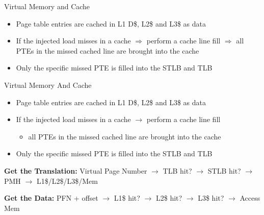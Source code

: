 \documentclass[aspectratio=169,12pt]{beamer}
\begin{document}
\begin{frame}{Virtual Memory and Cache}
\begin{tikzpicture}
\end{tikzpicture}

\footnotesize
\begin{itemize}
\item Page table entries are cached in L1 D\$, L2\$ and L3\$ as data
\item If the injected load misses in a cache $\Rightarrow$ perform a cache line fill $\Rightarrow$ all PTEs in the missed cached line are brought into the cache
\item Only the specific missed PTE is filled into the STLB and TLB
\end{itemize}
\end{frame}


\begin{frame}{Virtual Memory And Cache}
\begin{itemize}
\item Page table entries are cached in L1 D\$, L2\$ and L3\$ as data
\item If the injected load misses in a cache $\rightarrow$ perform a cache line fill
    \begin{itemize}
    \item all PTEs in the missed cached line are brought into the cache
    \end{itemize}
\item Only the specific missed PTE is filled into the STLB and TLB
\end{itemize}
\textbf{Get the Translation:}
Virtual Page Number $\rightarrow$ TLB hit? $\rightarrow$ STLB hit? $\rightarrow$ PMH $\rightarrow$ L1\$/L2\$/L3\$/Mem

\textbf{Get the Data:}
PFN + offset $\rightarrow$ L1\$ hit? $\rightarrow$ L2\$ hit? $\rightarrow$ L3\$ hit? $\rightarrow$ Access Mem
\end{frame}
\end{document}
